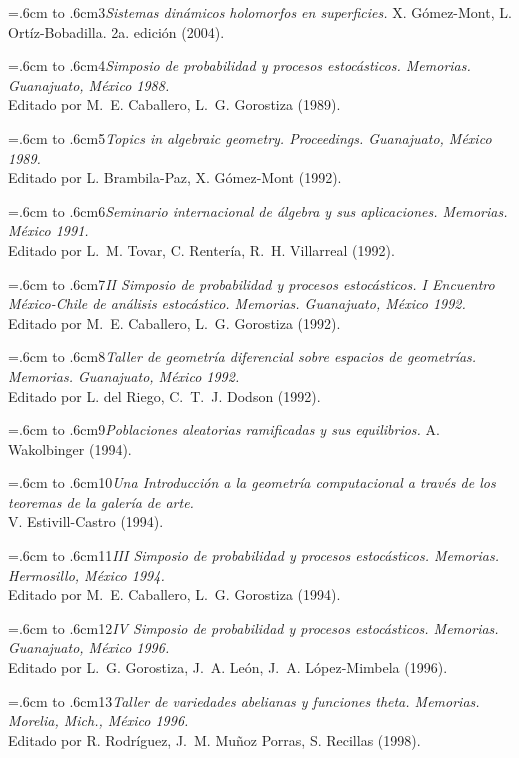 \documentclass[10pt,pagesize]{scrbook}
\numberwithin{equation}{chapter}
\def\bibl#1{\hangindent=.6cm \noindent \hbox to .6cm{#1\hfill}}
\begin{document}
\bibl{\hbox{\hskip3.5pt}3}{\itshape Sistemas dinámicos holomorfos en superficies.} 
X. Gómez-Mont, L. Ortíz-Bobadilla. 
2a. edición (2004). %

\bibl{\hbox{\hskip3.5pt}4}{\itshape Simposio de probabilidad y procesos estocásticos.
Memorias. Guanajuato, México 1988.} \\
Editado por M.$\!$~E. Caballero, L.$\!$~G. Gorostiza (1989).

\bibl{\hbox{\hskip3.5pt}5}{\itshape Topics in algebraic geometry. Proceedings.
Guanajuato, México 1989.} \\
Editado por L. Brambila-Paz, X. Gómez-Mont (1992). %

\bibl{\hbox{\hskip3.5pt}6}{\itshape Seminario internacional de álgebra y sus aplicaciones.
Memorias. México 1991.} \\
Editado por L.$\!$~M. Tovar, C. Rentería, R.$\!$~H. Villarreal
(1992). %

\bibl{\hbox{\hskip3.5pt}7}{\itshape II Simposio de probabilidad y procesos estocásticos. I
Encuentro México-Chile de análisis estocástico. Memorias.
Guanajuato, México 1992.} 
Editado por M.$\!$~E. Caballero, L.$\!$~G. Gorostiza (1992). %

\bibl{\hbox{\hskip3.5pt}8}{\itshape Taller de geometría diferencial sobre espacios de
geometrías. Memorias. Guanajuato, México 1992.} \\
Editado por L. del Riego, C.$\!$~T.$\!$~J. Dodson (1992). %

\bibl{\hbox{\hskip3.5pt}9}{\itshape Poblaciones aleatorias ramificadas y sus equilibrios.}
A. Wakolbinger (1994). %

\bibl{10}{\itshape Una Introducción a la geometría computacional a
través de los teoremas de la galería de arte.} \\
V. Estivill-Castro (1994). %

\bibl{11}{\itshape III Simposio de probabilidad y procesos estocásticos.
Memorias. Hermosillo, México 1994.} \\
Editado por M.$\!$~E. Caballero, L.$\!$~G. Gorostiza (1994). %

\bibl{12}{\itshape IV Simposio de probabilidad y procesos estocásticos.
Memorias. Guanajuato, México 1996.} \\
Editado por L.$\!$~G. Gorostiza, J.$\!$~A. León, J.$\!$~A.
López-Mimbela (1996). %

\bibl{13}{\itshape Taller de variedades abelianas y funciones theta.
Memorias. Morelia, Mich., México 1996.} \\
Editado por R. Rodríguez, J.$\!$~M. Muñoz Porras, S. Recillas
(1998). %
\end{document}
